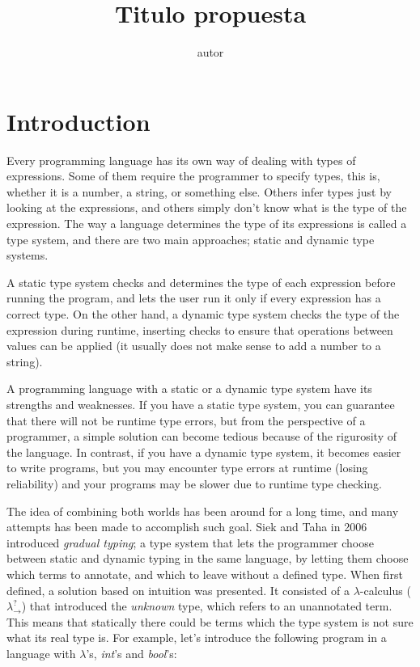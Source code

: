 \documentclass[submission]{eptcs}
\title{Titulo propuesta}
\author{ autor
\institute{Department of Computer Science\\
University of Chile\\
Santiago, Chile}
}
\begin{document}
\maketitle

\section{Introduction}

Every programming language has its own way of dealing with types of expressions. Some of them require the programmer to specify types, this is, whether it is a number, a string, or something else. Others infer types just by looking at the expressions, and others simply don't know what is the type of the expression. The way a language determines the type of its expressions is called a type system, and there are two main approaches; static and dynamic type systems.

A static type system checks and determines the type of each expression before running the program, and lets the user run it only if every expression has a correct type.
On the other hand, a dynamic type system checks the type of the expression during runtime, inserting checks to ensure that operations between values can be applied (it usually does not make sense to add a number to a string).


A programming language with a static or a dynamic type system have its strengths and weaknesses.
If you have a static type system, you can guarantee that there will not be runtime type errors, but from the perspective of a programmer, a simple solution can become tedious because of the rigurosity of the language.
In contrast, if you have a dynamic type system, it becomes easier to write programs, but you may encounter type errors at runtime (losing reliability) and your programs may be slower due to runtime type checking.

The idea of combining both worlds has been around for a long time, and many attempts has been made to accomplish such goal.
Siek and Taha in 2006 \cite{Siek2006GradualTF} introduced \textit{gradual typing};
a type system that lets the programmer choose between static and dynamic typing in the same language, by letting them choose which terms to annotate, and which to leave without a defined type.
When first defined, a solution based on intuition was presented.
It consisted of a $\lambda$-calculus ($\lambda^{?}_{\rightarrow}$) that introduced the \textit{unknown} type, which refers to an unannotated term.
This means that statically there could be terms which the type system is not sure what its real type is.
For example, let's introduce the following program in a language with $\lambda$'s, \textit{int}'s and \textit{bool}'s:
\end{document}
